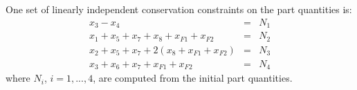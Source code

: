 
One set of linearly independent conservation constraints on the part
quantities is:
\begin{equation}
\begin{array}{lll}
x_3 - x_4 &=& N_1 \\
x_1+x_5+x_7+x_8+x_{F1}+x_{F2} &=& N_2 \\
x_2+x_5+x_7+2(x_8+x_{F1}+x_{F2}) &=& N_3 \\
x_3+x_6+x_7+x_{F1}+x_{F2} &=& N_4
\end{array}
\label{eq:cons}
\end{equation}
where $N_i$, $i=1,...,4$, are computed from the initial part
quantities.




